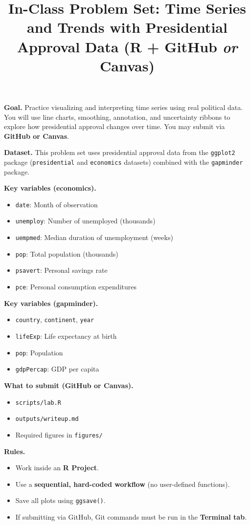 \documentclass[11pt]{article}
\title{In-Class Problem Set: Time Series and Trends with Presidential Approval Data (R + GitHub \emph{or} Canvas)}
\author{}
\date{}
\begin{document}
\maketitle

\noindent \textbf{Goal.} Practice visualizing and interpreting time series using real political data. You will use line charts, smoothing, annotation, and uncertainty ribbons to explore how presidential approval changes over time. You may submit via \textbf{GitHub or Canvas}.

\medskip
\noindent \textbf{Dataset.} This problem set uses presidential approval data from the \texttt{ggplot2} package (\texttt{presidential} and \texttt{economics} datasets) combined with the \texttt{gapminder} package.

\medskip
\noindent \textbf{Key variables (economics).}
\begin{itemize}
  \item \texttt{date}: Month of observation
  \item \texttt{unemploy}: Number of unemployed (thousands)
  \item \texttt{uempmed}: Median duration of unemployment (weeks)
  \item \texttt{pop}: Total population (thousands)
  \item \texttt{psavert}: Personal savings rate
  \item \texttt{pce}: Personal consumption expenditures
\end{itemize}

\noindent \textbf{Key variables (gapminder).}
\begin{itemize}
  \item \texttt{country}, \texttt{continent}, \texttt{year}
  \item \texttt{lifeExp}: Life expectancy at birth
  \item \texttt{pop}: Population
  \item \texttt{gdpPercap}: GDP per capita
\end{itemize}

\medskip
\noindent \textbf{What to submit (GitHub or Canvas).}
\begin{itemize}
  \item \texttt{scripts/lab.R}
  \item \texttt{outputs/writeup.md}
  \item Required figures in \texttt{figures/}
\end{itemize}

\medskip
\noindent \textbf{Rules.}
\begin{itemize}
  \item Work inside an \textbf{R Project}.
  \item Use a \textbf{sequential, hard-coded workflow} (no user-defined functions).
  \item Save all plots using \texttt{ggsave()}.
  \item If submitting via GitHub, Git commands must be run in the \textbf{Terminal tab}.
\end{itemize}
\end{document}
